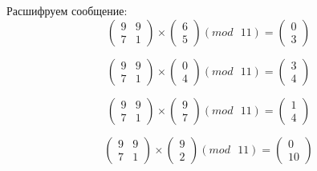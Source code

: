 \documentclass[a5paper, 10pt]{article}
\theoremstyle{definition}
\theoremstyle{plain}
\theoremstyle{remark}
\begin{document}
Расшифруем сообщение:
\begin{equation}
\begin{pmatrix}
 9 & 9\\
 7 &  1
\end{pmatrix}
 \times
\begin{pmatrix}
 6\\
5
\end{pmatrix}
(mod \text{ }11)
= \begin{pmatrix}
 0\\
3
\end{pmatrix}
\end{equation}

\begin{equation}
\begin{pmatrix}
 9 & 9\\
 7 &  1
\end{pmatrix}
 \times
\begin{pmatrix}
 0\\
4
\end{pmatrix}
(mod \text{ }11)
= \begin{pmatrix}
3\\
4
\end{pmatrix}
\end{equation}

\begin{equation}
\begin{pmatrix}
 9 & 9\\
 7 &  1
\end{pmatrix}
 \times
\begin{pmatrix}
 9\\
7
\end{pmatrix}
(mod \text{ }11)
= \begin{pmatrix}
1\\
4
\end{pmatrix}
\end{equation}

\begin{equation}
\begin{pmatrix}
 9 & 9\\
 7 &  1
\end{pmatrix}
 \times
\begin{pmatrix}
9\\
2
\end{pmatrix}
(mod \text{ }11)
= \begin{pmatrix}
0\\
10
\end{pmatrix}
\end{equation}
\end{document}
